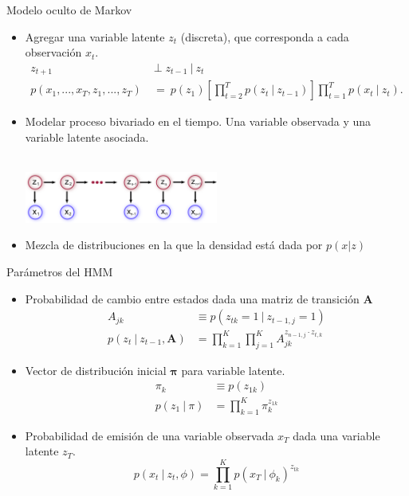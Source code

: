\begin{frame}{Modelo oculto de Markov}
  \begin{itemize}
    \itemsep1em
    \item Agregar una variable latente $z_t$ (discreta), que corresponda a cada observación $x_t$.
      \begin{align}
        z_{t+1} &\perp z_{t-1} ~|~ z_{t} \\
        p(x_1, ..., x_T, z_1, ..., z_T) &~=~ p(z_1) \left [ \prod_{t=2}^T p(z_t ~|~ z_{t-1}) \right ] 
          \prod_{t=1}^T p(x_t ~|~ z_{t}).
      \end{align}

    \item Modelar proceso bivariado en el tiempo. Una variable observada y una variable latente asociada.
      \\~\\
      \begin{center}
        \includegraphics[width=0.5\textwidth]{gfx/mod-hmm}
      \end{center}    
      
    \item Mezcla de distribuciones en la que la densidad está dada por $p(x | z)$      
  \end{itemize}
\end{frame}

\begin{frame}{Parámetros del HMM}
  \begin{itemize}
    \item Probabilidad de cambio entre estados dada una \alert{matriz de transición} $\mathbf{A}$
      \begin{align}
        A_{jk} &\equiv p(z_{tk} = 1 ~|~  z_{t-1, j} = 1) \\
        p(z_t ~|~ z_{t-1}, \mathbf{A}) &= \prod_{k=1}^K \prod_{j=1}^K A_{jk}^{z_{{n-1}, j} \cdot z_{t,k}}
      \end{align}      
    \item \alert{Vector de distribución inicial} $\bm{\pi}$ para variable latente.
      \begin{align}
        \pi_k &\equiv p(z_{1k}) \\
        p(z_1 ~|~ \pi) &= \prod_{k=1}^K \pi_k^{z_{1k}}
      \end{align}       
    \item \alert{Probabilidad de emisión} de una variable observada $x_T$ dada una variable latente $z_T$.
      \begin{equation}
        p(x_t ~|~ z_t, \phi) = \prod_{k=1}^K p(x_T ~|~ \phi_k) ^ {z_{tk}}
      \end{equation}
  \end{itemize}
\end{frame}

